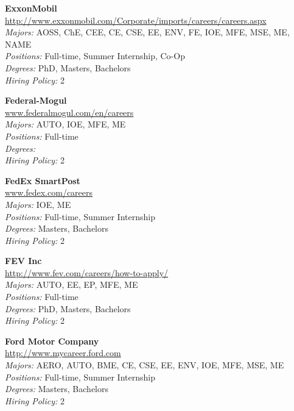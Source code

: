 \documentclass[twoside]{article}
\begin{document}
\begin{center}
\begin{multicols}{3}
\begin{minipage}{.9\columnwidth}{\Large\bf ExxonMobil }\\
	\url{http://www.exxonmobil.com/Corporate/imports/careers/careers.aspx}\\
	\emph{Majors:} AOSS, ChE, CEE, CE, CSE, EE, ENV, FE, IOE, MFE, MSE, ME, NAME\\
	\emph{Positions:} Full-time, Summer Internship, Co-Op\\
	\emph{Degrees:} PhD, Masters, Bachelors\\
	\emph{Hiring Policy:} 2\\
\end{minipage}
 
\begin{minipage}{.9\columnwidth}{\Large\bf Federal-Mogul }\\
	\url{www.federalmogul.com/en/careers}\\
	\emph{Majors:} AUTO, IOE, MFE, ME\\
	\emph{Positions:} Full-time\\
	\emph{Degrees:} \\
	\emph{Hiring Policy:} 2\\
\end{minipage}
 
\begin{minipage}{.9\columnwidth}{\Large\bf FedEx SmartPost }\\
	\url{www.fedex.com/careers}\\
	\emph{Majors:} IOE, ME\\
	\emph{Positions:} Full-time, Summer Internship\\
	\emph{Degrees:} Masters, Bachelors\\
	\emph{Hiring Policy:} 2\\
\end{minipage}
 
\begin{minipage}{.9\columnwidth}{\Large\bf FEV Inc }\\
	\url{http://www.fev.com/careers/how-to-apply/}\\
	\emph{Majors:} AUTO, EE, EP, MFE, ME\\
	\emph{Positions:} Full-time\\
	\emph{Degrees:} PhD, Masters, Bachelors\\
	\emph{Hiring Policy:} 2\\
\end{minipage}
 
\begin{minipage}{.9\columnwidth}{\Large\bf Ford Motor Company }\\
	\url{http://www.mycareer.ford.com}\\
	\emph{Majors:} AERO, AUTO, BME, CE, CSE, EE, ENV, IOE, MFE, MSE, ME\\
	\emph{Positions:} Full-time, Summer Internship\\
	\emph{Degrees:} Masters, Bachelors\\
	\emph{Hiring Policy:} 2\\
\end{minipage}
 

\end{multicols}
\end{center}
\end{document}
